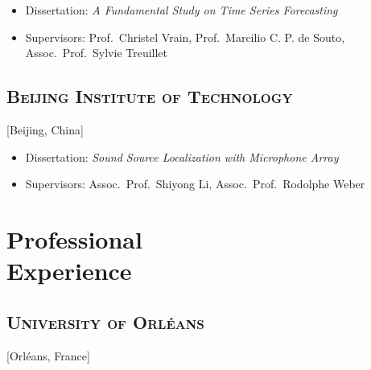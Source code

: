 \documentclass{mycv}
\begin{document}
\begin{positions}
\end{positions}

\vspace{-\parskip}

\begin{itemize}[label={}]
  \itemsep 0em
  \item Dissertation: \textit{A Fundamental Study on Time Series Forecasting}
  \item Supervisors: Prof.~Christel Vrain, Prof.~Marcilio C. P. de Souto, Assoc.~Prof.~Sylvie Treuillet
\end{itemize}

\vspace{-\parskip}

\subsection{\scshape Beijing Institute of Technology}[Beijing, China]

\begin{positions}
\end{positions}

\vspace{-\parskip}

\begin{itemize}[label={}]
  \itemsep 0em
  \item Dissertation: \textit{Sound Source Localization with Microphone Array}
  \item Supervisors: Assoc.~Prof.~Shiyong Li, Assoc.~Prof.~Rodolphe Weber
\end{itemize}

\section{Professional \\ Experience}

\subsection{\scshape University of Orl\'eans}[Orl\'eans, France]

\begin{positions}
\end{positions}
\end{document}
